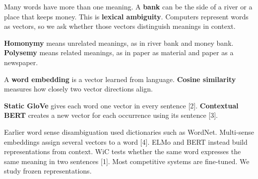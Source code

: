 \documentclass{article}
\begin{document}
\bodyfont
{}

\noindent
\begin{minipage}[t][560mm][s]{0.315\textwidth}\vspace{0pt}\RaggedRight
{}
Many words have more than one meaning. A \textbf{bank} can be the side of a river or a place that keeps money. This is \textbf{lexical ambiguity}. Computers represent words as vectors, so we ask whether those vectors distinguish meanings in context.

\vfill
{}
\textbf{Homonymy} means unrelated meanings, as in river bank and money bank. \textbf{Polysemy} means related meanings, as in paper as material and paper as a newspaper.

A \textbf{word embedding} is a vector learned from language. \textbf{Cosine similarity} measures how closely two vector directions align.

\textbf{Static GloVe} gives each word one vector in every sentence [2]. \textbf{Contextual BERT} creates a new vector for each occurrence using its sentence [3].

\vfill
{}
Earlier word sense disambiguation used dictionaries such as WordNet. Multi-sense embeddings assign several vectors to a word [4]. ELMo and BERT instead build representations from context. WiC tests whether the same word expresses the same meaning in two sentences [1]. Most competitive systems are fine-tuned. We study frozen representations.
\end{minipage}\hfill
\end{document}
